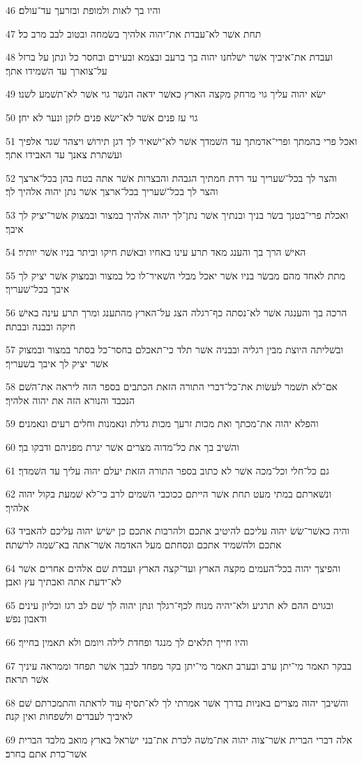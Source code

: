 \par 46 והיו בך לאות ולמופת ובזרעך עד־עולם׃
\par 47 תחת אשׁר לא־עבדת את־יהוה אלהיך בשׂמחה ובטוב לבב מרב כל׃
\par 48 ועבדת את־איביך אשׁר ישׁלחנו יהוה בך ברעב ובצמא ובעירם ובחסר כל ונתן על ברזל על־צוארך עד השׁמידו אתך׃
\par 49 ישׂא יהוה עליך גוי מרחק מקצה הארץ כאשׁר ידאה הנשׁר גוי אשׁר לא־תשׁמע לשׁנו׃
\par 50 גוי עז פנים אשׁר לא־ישׂא פנים לזקן ונער לא יחן׃
\par 51 ואכל פרי בהמתך ופרי־אדמתך עד השׁמדך אשׁר לא־ישׁאיר לך דגן תירושׁ ויצהר שׁגר אלפיך ועשׁתרת צאנך עד האבידו אתך׃
\par 52 והצר לך בכל־שׁעריך עד רדת חמתיך הגבהת והבצרות אשׁר אתה בטח בהן בכל־ארצך והצר לך בכל־שׁעריך בכל־ארצך אשׁר נתן יהוה אלהיך לך׃
\par 53 ואכלת פרי־בטנך בשׂר בניך ובנתיך אשׁר נתן־לך יהוה אלהיך במצור ובמצוק אשׁר־יציק לך איבך׃
\par 54 האישׁ הרך בך והענג מאד תרע עינו באחיו ובאשׁת חיקו וביתר בניו אשׁר יותיר׃
\par 55 מתת לאחד מהם מבשׂר בניו אשׁר יאכל מבלי השׁאיר־לו כל במצור ובמצוק אשׁר יציק לך איבך בכל־שׁעריך׃
\par 56 הרכה בך והענגה אשׁר לא־נסתה כף־רגלה הצג על־הארץ מהתענג ומרך תרע עינה באישׁ חיקה ובבנה ובבתה׃
\par 57 ובשׁליתה היוצת מבין רגליה ובבניה אשׁר תלד כי־תאכלם בחסר־כל בסתר במצור ובמצוק אשׁר יציק לך איבך בשׁעריך׃
\par 58 אם־לא תשׁמר לעשׂות את־כל־דברי התורה הזאת הכתבים בספר הזה ליראה את־השׁם הנכבד והנורא הזה את יהוה אלהיך׃
\par 59 והפלא יהוה את־מכתך ואת מכות זרעך מכות גדלת ונאמנות וחלים רעים ונאמנים׃
\par 60 והשׁיב בך את כל־מדוה מצרים אשׁר יגרת מפניהם ודבקו בך׃
\par 61 גם כל־חלי וכל־מכה אשׁר לא כתוב בספר התורה הזאת יעלם יהוה עליך עד השׁמדך׃
\par 62 ונשׁארתם במתי מעט תחת אשׁר הייתם ככוכבי השׁמים לרב כי־לא שׁמעת בקול יהוה אלהיך׃
\par 63 והיה כאשׁר־שׂשׂ יהוה עליכם להיטיב אתכם ולהרבות אתכם כן ישׂישׂ יהוה עליכם להאביד אתכם ולהשׁמיד אתכם ונסחתם מעל האדמה אשׁר־אתה בא־שׁמה לרשׁתה׃
\par 64 והפיצך יהוה בכל־העמים מקצה הארץ ועד־קצה הארץ ועבדת שׁם אלהים אחרים אשׁר לא־ידעת אתה ואבתיך עץ ואבן׃
\par 65 ובגוים ההם לא תרגיע ולא־יהיה מנוח לכף־רגלך ונתן יהוה לך שׁם לב רגז וכליון עינים ודאבון נפשׁ׃
\par 66 והיו חייך תלאים לך מנגד ופחדת לילה ויומם ולא תאמין בחייך׃
\par 67 בבקר תאמר מי־יתן ערב ובערב תאמר מי־יתן בקר מפחד לבבך אשׁר תפחד וממראה עיניך אשׁר תראה׃
\par 68 והשׁיבך יהוה מצרים באניות בדרך אשׁר אמרתי לך לא־תסיף עוד לראתה והתמכרתם שׁם לאיביך לעבדים ולשׁפחות ואין קנה׃
\par 69 אלה דברי הברית אשׁר־צוה יהוה את־משׁה לכרת את־בני ישׂראל בארץ מואב מלבד הברית אשׁר־כרת אתם בחרב׃

